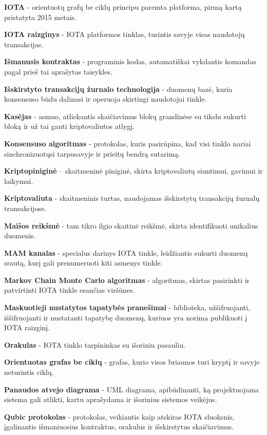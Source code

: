 \noindent \textbf{IOTA} - orientuotų grafų be ciklų principu paremta platforma, pirmą kartą pristatyta 2015 metais.

\noindent \textbf{IOTA raizginys} - IOTA platformos tinklas, turintis savyje visas naudotojų transakcijas.

\noindent \textbf{Išmanusis kontraktas} - programinis kodas, automatiškai vykdantis komandas pagal prieš tai aprašytas taisykles.

\noindent \textbf{Išskirstyto transakcijų žurnalo technologija} - duomenų bazė, kuria konsensuso būdu dalinasi ir operuoja skirtingi naudotojai tinkle.

\noindent \textbf{Kasėjas} - asmuo, atliekantis skaičiavimus blokų grandinėse su tikslu sukurti bloką ir už tai gauti kriptovaliutos atlygį.

\noindent \textbf{Konsensuso algoritmas} - protokolas, kuris pasirūpina, kad visi tinklo nariai sinchronizuotųsi tarpusavyje ir prieitų bendrą sutarimą.

\noindent \textbf{Kriptopiniginė} – skaitmeninė piniginė, skirta kriptovaliutų siuntimui, gavimui ir laikymui.

\noindent \textbf{Kriptovaliuta} - skaitmeninis turtas, naudojamas išskirstytų transakcijų žurnalų transakcijose.

\noindent \textbf{Maišos reikšmė} - tam tikro ilgio skaitinė reikšmė, skirta identifikuoti unikalius duomenis.

\noindent \textbf{MAM kanalas} - specialus darinys IOTA tinkle, leidžiantis sukurti duomenų srautą, kurį gali prenumeruoti kiti asmenys tinkle.

\noindent \textbf{Markov Chain Monte Carlo algoritmas} - algoritmas, skirtas pasirinkti ir patvirtinti IOTA tinkle esančias viršūnes.

\noindent \textbf{Maskuotieji nustatytos tapatybės pranešimai} - biblioteka, užšifruojanti, iššifruojanti ir nustatanti tapatybę duomenų, kuriuos yra norima publikuoti į IOTA raizginį.

\noindent \textbf{Orakulas} - IOTA tinklo tarpininkas su išoriniu pasauliu.

\noindent \textbf{Orientuotas grafas be ciklų} - grafas, kurio visos briaunos turi kryptį ir savyje neturintis ciklų.

\noindent \textbf{Panaudos atvejo diagrama} - UML diagrama, apibūdinanti, ką projektuojama sistema gali atlikti, kartu aprašydama ir išorinius sistemos veikėjus. 

\noindent \textbf{Qubic protokolas} - protokolas, veikiantis kaip atskiras IOTA sluoksnis, įgalinantis išmaniuosius kontraktus, orakulus ir išskirstytus skaičiavimus.

